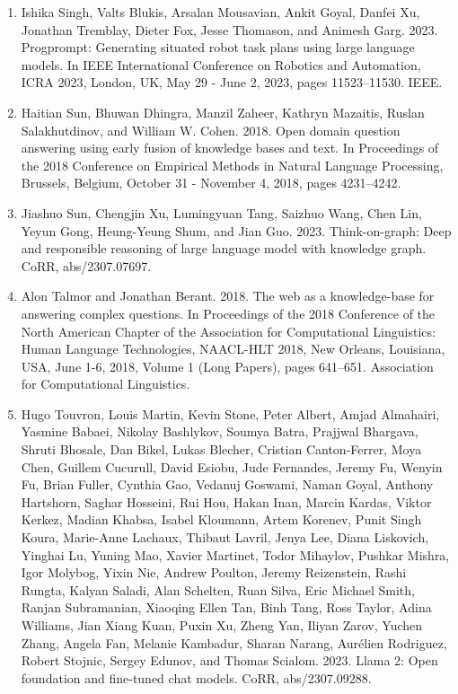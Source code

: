 \documentclass[11pt,UTF8,fontset=fandol]{ctexart}
\begin{document}
\begin{enumerate}[leftmargin=2em]
\item Ishika Singh, Valts Blukis, Arsalan Mousavian, Ankit Goyal, Danfei Xu, Jonathan Tremblay, Dieter Fox, Jesse Thomason, and Animesh Garg. 2023. Progprompt: Generating situated robot task plans using large language models. In IEEE International Conference on Robotics and Automation, ICRA 2023, London, UK, May 29 - June 2, 2023, pages 11523--11530. IEEE.
\item Haitian Sun, Bhuwan Dhingra, Manzil Zaheer, Kathryn Mazaitis, Ruslan Salakhutdinov, and William W. Cohen. 2018. Open domain question answering using early fusion of knowledge bases and text. In Proceedings of the 2018 Conference on Empirical Methods in Natural Language Processing, Brussels, Belgium, October 31 - November 4, 2018, pages 4231--4242.
\item Jiashuo Sun, Chengjin Xu, Lumingyuan Tang, Saizhuo Wang, Chen Lin, Yeyun Gong, Heung-Yeung Shum, and Jian Guo. 2023. Think-on-graph: Deep and responsible reasoning of large language model with knowledge graph. CoRR, abs/2307.07697.
\item Alon Talmor and Jonathan Berant. 2018. The web as a knowledge-base for answering complex questions. In Proceedings of the 2018 Conference of the North American Chapter of the Association for Computational Linguistics: Human Language Technologies, NAACL-HLT 2018, New Orleans, Louisiana, USA, June 1-6, 2018, Volume 1 (Long Papers), pages 641--651. Association for Computational Linguistics.
\item Hugo Touvron, Louis Martin, Kevin Stone, Peter Albert, Amjad Almahairi, Yasmine Babaei, Nikolay Bashlykov, Soumya Batra, Prajjwal Bhargava, Shruti Bhosale, Dan Bikel, Lukas Blecher, Cristian Canton-Ferrer, Moya Chen, Guillem Cucurull, David Esiobu, Jude Fernandes, Jeremy Fu, Wenyin Fu, Brian Fuller, Cynthia Gao, Vedanuj Goswami, Naman Goyal, Anthony Hartshorn, Saghar Hosseini, Rui Hou, Hakan Inan, Marcin Kardas, Viktor Kerkez, Madian Khabsa, Isabel Kloumann, Artem Korenev, Punit Singh Koura, Marie-Anne Lachaux, Thibaut Lavril, Jenya Lee, Diana Liskovich, Yinghai Lu, Yuning Mao, Xavier Martinet, Todor Mihaylov, Pushkar Mishra, Igor Molybog, Yixin Nie, Andrew Poulton, Jeremy Reizenstein, Rashi Rungta, Kalyan Saladi, Alan Schelten, Ruan Silva, Eric Michael Smith, Ranjan Subramanian, Xiaoqing Ellen Tan, Binh Tang, Ross Taylor, Adina Williams, Jian Xiang Kuan, Puxin Xu, Zheng Yan, Iliyan Zarov, Yuchen Zhang, Angela Fan, Melanie Kambadur, Sharan Narang, Aurélien Rodriguez, Robert Stojnic, Sergey Edunov, and Thomas Scialom. 2023. Llama 2: Open foundation and fine-tuned chat models. CoRR, abs/2307.09288.

\end{enumerate}
\end{document}
